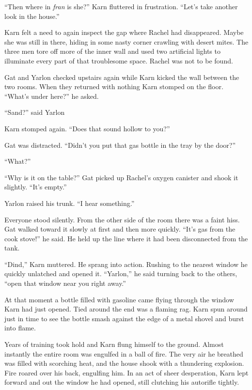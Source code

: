 ``Then where in \textit{fran} is she?'' Karn fluttered in frustration. ``Let's take another look
in the house.''

Karn felt a need to again inspect the gap where Rachel had disappeared. Maybe she was still in
there, hiding in some nasty corner crawling with desert mites. The three men tore off more of
the inner wall and used two artificial lights to illuminate every part of that troublesome
space. Rachel was not to be found.


Gat and Yarlon checked upstairs again while Karn kicked the wall between the two rooms. When
they returned with nothing Karn stomped on the floor. ``What's under here?'' he asked.

``Sand?'' said Yarlon

Karn stomped again. ``Does that sound hollow to you?''

Gat was distracted. ``Didn't you put that gas bottle in the tray by the door?''

``What?''

``Why is it on the table?'' Gat picked up Rachel's oxygen canister and shook it slightly. ``It's
empty.''

Yarlon raised his trunk. ``I hear something.''

Everyone stood silently. From the other side of the room there was a faint hiss. Gat walked
toward it slowly at first and then more quickly. ``It's gas from the cook stove!'' he said. He
held up the line where it had been disconnected from the tank.

``Dind,'' Karn muttered. He sprang into action. Rushing to the nearest window he quickly
unlatched and opened it. ``Yarlon,'' he said turning back to the others, ``open that window near
you right away.''

At that moment a bottle filled with gasoline came flying through the window Karn had just
opened. Tied around the end was a flaming rag. Karn spun around just in time to see the bottle
smash against the edge of a metal shovel and burst into flame.

Years of training took hold and Karn flung himself to the ground. Almost instantly the entire
room was engulfed in a ball of fire. The very air he breathed was filled with scorching heat,
and the house shook with a thundering explosion. Fire roared over his back, engulfing him. In an
act of sheer desperation, Karn lept forward and out the window he had opened, still clutching
his autorifle tightly.

